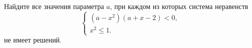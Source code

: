 \begin{ex}
	\begin{condition}
		Найдите все значения параметра \( a \), при каждом из которых система неравенств
		\[ \left\{
		\begin{array}{l}
			(a-x^2)(a+x-2)<0,\\
			x^2\le1.
		\end{array}
		\right. \]
		не имеет решений.
	\end{condition}
	\answer{\( (-\infty;0]\cup[3;+\infty) \)}
\end{ex}